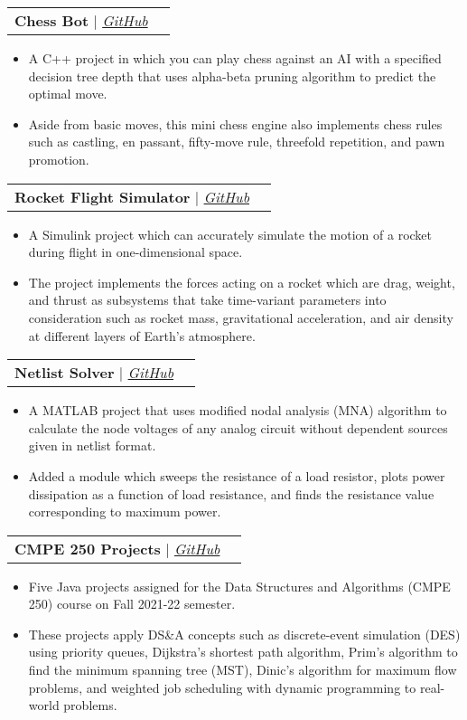 \documentclass[letterpaper,11pt]{article}
\makeatletter
\newcommand{\resumeItem}[1]{
  \item\small{
    {#1 \vspace{-2pt}}
  }
}
\newcommand{\resumeProjectHeading}[2]{
    \item
    \begin{tabular*}{0.97\textwidth}{l@{\extracolsep{\fill}}r}
      \small#1 & #2 \\
    \end{tabular*}\vspace{-7pt}
}
\newcommand{\resumeItemListStart}{\begin{itemize}}
\newcommand{\resumeItemListEnd}{\end{itemize}\vspace{-5pt}}
\makeatother
\begin{document}
      \resumeProjectHeading
        {\textbf{Chess Bot} $|$ \emph{\href{https://github.com/arasgungore/chess-bot}{\color{blue}GitHub}}}{}
          \resumeItemListStart
            \resumeItem{A C++ project in which you can play chess against an AI with a specified decision tree depth that uses alpha-beta pruning algorithm to predict the optimal move.}
            \resumeItem{Aside from basic moves, this mini chess engine also implements chess rules such as castling, en passant, fifty-move rule, threefold repetition, and pawn promotion.}
          \resumeItemListEnd
      
      \resumeProjectHeading
        {\textbf{Rocket Flight Simulator} $|$ \emph{\href{https://github.com/arasgungore/rocket-flight-simulator}{\color{blue}GitHub}}}{}
          \resumeItemListStart
            \resumeItem{A Simulink project which can accurately simulate the motion of a rocket during flight in one-dimensional space.}
            \resumeItem{The project implements the forces acting on a rocket which are drag, weight, and thrust as subsystems that take time-variant parameters into consideration such as rocket mass, gravitational acceleration, and air density at different layers of Earth's atmosphere.}
          \resumeItemListEnd
      
      \resumeProjectHeading
        {\textbf{Netlist Solver} $|$ \emph{\href{https://github.com/arasgungore/netlist-solver}{\color{blue}GitHub}}}{}
          \resumeItemListStart
            \resumeItem{A MATLAB project that uses modified nodal analysis (MNA) algorithm to calculate the node voltages of any analog circuit without dependent sources given in netlist format.}
            \resumeItem{Added a module which sweeps the resistance of a load resistor, plots power dissipation as a function of load resistance, and finds the resistance value corresponding to maximum power.}
          \resumeItemListEnd
      
      \resumeProjectHeading
        {\textbf{CMPE 250 Projects} $|$ \emph{\href{https://github.com/arasgungore/cmpe250-projects}{\color{blue}GitHub}}}{}
          \resumeItemListStart
            \resumeItem{Five Java projects assigned for the Data Structures and Algorithms (CMPE 250) course on Fall 2021-22 semester.}
            \resumeItem{These projects apply DS\&A concepts such as discrete-event simulation (DES) using priority queues, Dijkstra's shortest path algorithm, Prim's algorithm to find the minimum spanning tree (MST), Dinic's algorithm for maximum flow problems, and weighted job scheduling with dynamic programming to real-world problems.}
          \resumeItemListEnd
      
\end{document}
